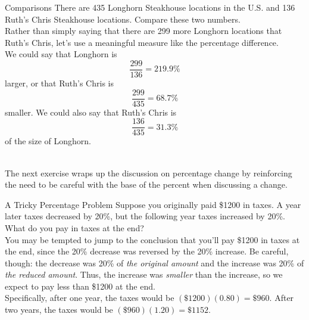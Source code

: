 \begin{example}[https://www.youtube.com/watch?v=gSA_go511q4]{Comparisons}
There are 435 Longhorn Steakhouse locations in the U.S. and 136 Ruth's Chris Steakhouse locations.  Compare these two numbers.\\

Rather than simply saying that there are 299 more Longhorn locations that Ruth's Chris, let's use a meaningful measure like the percentage difference.\\

We could say that Longhorn is \[\frac{299}{136} = 219.9\%\] larger, or that Ruth's Chris is \[\frac{299}{435} = 68.7\%\] smaller.  We could also say that Ruth's Chris is \[\frac{136}{435} = 31.3\%\] of the size of Longhorn.
\end{example}
\text{}\\

The next exercise wraps up the discussion on percentage change by reinforcing the need to be careful with the base of the percent when discussing a change.\\

\begin{example}[https://www.youtube.com/watch?v=SOSt8uYaObc]{A Tricky Percentage Problem}
Suppose you originally paid \$1200 in taxes.  A year later taxes decreased by 20\%, but the following year taxes increased by 20\%.  What do you pay in taxes at the end?\\

You may be tempted to jump to the conclusion that you'll pay \$1200 in taxes at the end, since the 20\% decrease was reversed by the 20\% increase.  Be careful, though: the decrease was 20\% of \emph{the original amount} and the increase was 20\% of \emph{the reduced amount}.  Thus, the increase was \emph{smaller} than the increase, so we expect to pay less than \$1200 at the end.\\

Specifically, after one year, the taxes would be $(\$1200)(0.80) = \$960$.  After two years, the taxes would be $(\$960)(1.20) = \$1152$.
\end{example}

